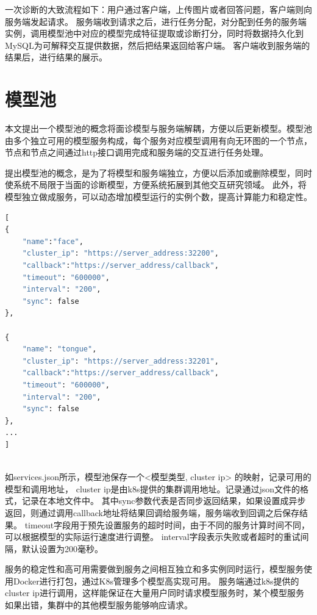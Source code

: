一次诊断的大致流程如下：用户通过客户端，上传图片或者回答问题，客户端则向服务端发起请求。
服务端收到请求之后，进行任务分配，对分配到任务的服务端实例，调用模型池中对应的模型完成特征提取或诊断打分，同时将数据持久化到MySQL为可解释交互提供数据，然后把结果返回给客户端。
客户端收到服务端的结果后，进行结果的展示。

\section{模型池}
本文提出一个模型池的概念将面诊模型与服务端解耦，方便以后更新模型。模型池由多个独立可用的模型服务构成，每个服务对应模型调用有向无环图的一个节点，节点和节点之间通过http接口调用完成和服务端的交互进行任务处理。

提出模型池的概念，是为了将模型和服务端独立，方便以后添加或删除模型，同时使系统不局限于当面的诊断模型，方便系统拓展到其他交互研究领域。
此外，将模型独立做成服务，可以动态增加模型运行的实例个数，提高计算能力和稳定性。



\begin{lstlisting}[language={Python}, title=services.json]
[
{
    "name":"face",
    "cluster_ip": "https://server_address:32200",
    "callback":"https://server_address/callback",
    "timeout": "600000",
    "interval": "200",
    "sync": false
}, 

{
    "name": "tongue",
    "cluster_ip": "https://server_address:32201",
    "callback":"https://server_address/callback",
    "timeout": "600000",
    "interval": "200",
    "sync": false
},
...
]
    
\end{lstlisting}

如services.json所示，模型池保存一个<模型类型, cluster ip> 的映射，记录可用的模型和调用地址， cluster ip是由k8s提供的集群调用地址。记录通过json文件的格式，记录在本地文件中。
其中sync参数代表是否同步返回结果，如果设置成异步返回，则通过调用callback地址将结果回调给服务端，服务端收到回调之后保存结果。
timeout字段用于预先设置服务的超时时间，由于不同的服务计算时间不同，可以根据模型的实际运行速度进行调整。
interval字段表示失败或者超时的重试间隔，默认设置为200毫秒。

服务的稳定性和高可用需要做到服务之间相互独立和多实例同时运行，模型服务使用Docker进行打包，通过K8s管理多个模型高实现可用。
服务端通过k8s提供的cluster ip进行调用，这样能保证在大量用户同时请求模型服务时，某个模型服务如果出错，集群中的其他模型服务能够响应请求。


